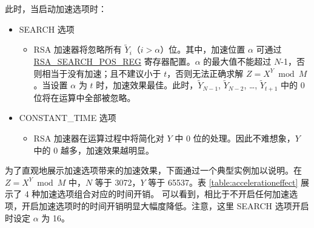 \documentclass[main\_\_CN.tex]{subfiles}
\begin{document}
此时，当启动加速选项时：
\begin{itemize}
\item SEARCH 选项
    \begin{itemize}
        \item RSA 加速器将忽略所有 \begin{math} \widetilde{Y}_{i} \end{math}（\begin{math} i > \alpha \end{math}）位。其中，加速位置 \begin{math} \alpha \end{math} 可通过 \hyperref[regdesc:RSASEARCHPOSREG]{RSA\_SEARCH\_POS\_REG} 寄存器配置。\begin{math} \alpha \end{math} 的最大值不能超过 \begin{math}N\end{math}-1，否则相当于没有加速；且不建议小于 \begin{math} t \end{math}，否则无法正确求解 \begin{math}Z = X^{Y} \bmod M \end{math}。当设置 \begin{math} \alpha \end{math} 为 \begin{math} t \end{math} 时，加速效果最佳。此时，\begin{math}\widetilde{Y}_{N-1}\end{math}, \begin{math}\widetilde{Y}_{N-2}\end{math}, \dots, \begin{math}\widetilde{Y}_{t+1}\end{math} 中的 0 位将在运算中全部被忽略。
    \end{itemize}
\item CONSTANT\_TIME 选项
    \begin{itemize}
        \item RSA 加速器在运算过程中将简化对 \begin{math} Y \end{math} 中 0 位的处理。因此不难想象，\begin{math} Y \end{math} 中的 0 越多，加速效果越明显。
    \end{itemize}
\end{itemize}

为了直观地展示加速选项带来的加速效果，下面通过一个典型实例加以说明。在 \begin{math}Z = X^{Y} \bmod M\end{math} 中，\begin{math}N\end{math} 等于 3072，\begin{math}Y\end{math} 等于 65537。表 \ref{table:accelerationeffect} 展示了 4 种加速选项组合对应的时间开销。
可以看到，相比于不开启任何加速选项，开启加速选项时的时间开销明显大幅度降低。注意，这里 SEARCH 选项开启时设定 \begin{math} \alpha \end{math} 为 16。
\end{document}
